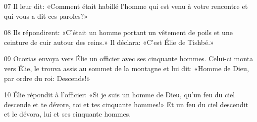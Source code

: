
07 Il leur dit: «Comment était habillé l’homme qui est venu à votre rencontre et qui vous a dit ces paroles?»

08 Ils répondirent: «C’était un homme portant un vêtement de poils et une ceinture de cuir autour des reins.» Il déclara: «C’est Élie de Tishbé.»

09 Ocozias envoya vers Élie un officier avec ses cinquante hommes. Celui-ci monta vers Élie, le trouva assis au sommet de la montagne et lui dit: «Homme de Dieu, par ordre du roi: Descends!»

10 Élie répondit à l’officier: «Si je suis un homme de Dieu, qu’un feu du ciel descende et te dévore, toi et tes cinquante hommes!» Et un feu du ciel descendit et le dévora, lui et ses cinquante hommes.	